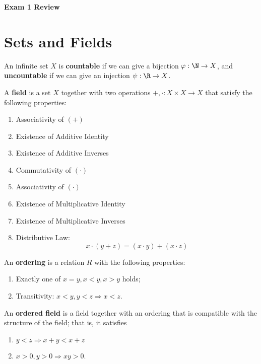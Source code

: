 \documentclass{notes}
\renewcommand{\emph}[1]{\textbf{#1}}
\begin{document}
\begin{center}
  \textsf{\textbf{\Huge Exam 1 Review}}
\end{center}
\section{Sets and Fields}
\begin{defn}
  An infinite set $X$ is \emph{countable} if we can give a bijection $\varphi: \N \to X$, and \emph{uncountable}
if we can give an injection $\psi: \R \to X$.
\end{defn}

\begin{defn}
  A \emph{field} is a set $X$ together with two operations $+, \cdot: X\times X \to X$ that satisfy 
the following properties:
\begin{enumerate}
  \item Associativity of\/ $(+)$
  \item Existence of Additive Identity
  \item Existence of Additive Inverses
  \item Commutativity of\/ $(\cdot)$
  \item Associativity of\/ $(\cdot)$
  \item Existence of Multiplicative Identity
  \item Existence of Multiplicative Inverses
  \item Distributive Law: $$x \cdot (y + z) = (x \cdot y) + (x \cdot z)$$ 
\end{enumerate}
\end{defn}

\begin{defn}
  An \emph{ordering} is a relation $R$ with the following properties:
\begin{enumerate}
  \item Exactly one of $x = y, x < y, x > y$ holds;
  \item Transitivity: $x < y, y < z \Rightarrow x < z$.
\end{enumerate}
\end{defn}

\begin{defn}
  An \emph{ordered field} is a field together with an ordering that is compatible with the structure
of the field; that is, it satisfies 
\begin{enumerate}
  \item $y < z \Rightarrow x + y < x + z$
  \item $x > 0, y > 0 \Rightarrow xy > 0$.  
\end{enumerate}
\end{defn}
\end{document}
